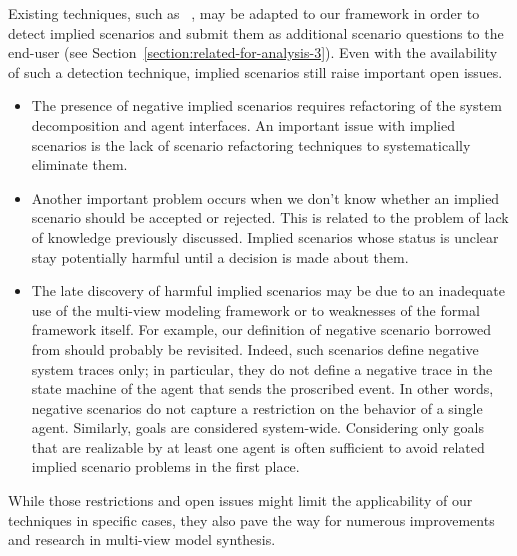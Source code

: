 Existing techniques, such as ~\cite{Uchitel:2004}, may be adapted to our framework in order to detect implied scenarios and submit them as additional scenario questions to the end-user (see Section~\ref{section:related-for-analysis-3}). Even with the availability of such a detection technique, implied scenarios still raise important open issues.
\begin{itemize}
\item The presence of negative implied scenarios requires refactoring of the system decomposition and agent interfaces. An important issue with implied scenarios is the lack of scenario refactoring techniques to systematically eliminate them.
\item Another important problem occurs when we don't know whether an implied scenario should be accepted or rejected. This is related to the problem of lack of knowledge previously discussed. Implied scenarios whose status is unclear stay potentially harmful until a decision is made about them.
\item The late discovery of harmful implied scenarios may be due to an inadequate use of the multi-view modeling framework or to weaknesses of the formal framework itself. For example, our definition of negative scenario borrowed from \cite{Uchitel:2002} should probably be revisited. Indeed, such scenarios define negative system traces only; in particular, they do not define a negative trace in the state machine of the agent that sends the proscribed event. In other words, negative scenarios do not capture a restriction on the behavior of a single agent. Similarly, goals are considered system-wide. Considering only goals that are realizable by at least one agent is often sufficient to avoid related implied scenario problems in the first place.
\end{itemize}

While those restrictions and open issues might limit the applicability of our techniques in specific cases, they also pave the way for numerous improvements and research in multi-view model synthesis.
